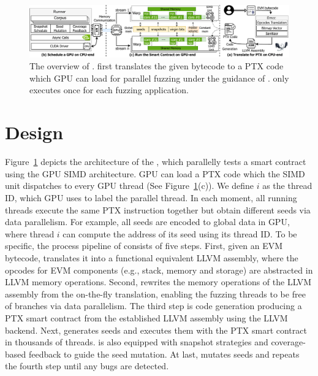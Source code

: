 \begin{figure}[!ht]
\centerline{\includegraphics[width=\textwidth]{images/GFL-overview.drawio.pdf}}
\caption{The overview of {\tool}. {\translator} first translates the given bytecode to a PTX code which GPU can load for parallel fuzzing under the guidance of {\runner}. {\translator} only executes once for each fuzzing application.}
\vspace{-0.1in}
\label{fig:overview}
\end{figure}

\section{Design}
\label{sec:design}

Figure~\ref{fig:overview} depicts the architecture of the {\tool}, which parallelly tests a smart contract using the GPU SIMD architecture.
%
GPU can load a PTX code which the SIMD unit dispatches to every GPU thread (See Figure~\ref{fig:overview}(c)). 
We define $i$ as the thread ID, which GPU uses to label the parallel thread.
In each moment, all running threads execute the same PTX instruction together but obtain different seeds via data parallelism\cite{cuda2006datapara}.
For example, all seeds are encoded to global data in GPU, where thread $i$ can compute the address of its seed using its thread ID.
%
%
To be specific, the process pipeline of {\tool} consists of five steps. 
%
First, given an EVM bytecode, {\translator} translates it into a functional equivalent LLVM assembly, where the opcodes for EVM components (e.g., stack, memory and storage) are abstracted in LLVM memory operations.
%
Second, {\translator} rewrites the memory operations of the LLVM assembly from the on-the-fly translation, enabling the fuzzing threads to be free of branches via data parallelism.
%
The third step is code generation producing a PTX smart contract from the established LLVM assembly using the LLVM backend\cite{llvm2021bin}.
Next, {\runner} generates seeds and executes them with the PTX smart contract in thousands of threads. 
{\runner} is also equipped with snapshot strategies and coverage-based feedback to guide the seed mutation.
At last, {\runner} mutates seeds and repeats the fourth step until any bugs are detected. 
%



